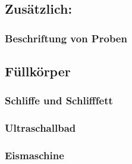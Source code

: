 \subsection{Zusätzlich:}
\subsubsection{Beschriftung von Proben}
\subsection{Füllkörper}
\subsubsection{Schliffe und Schlifffett}
\subsubsection{Ultraschallbad}
\subsubsection{Eismaschine}
